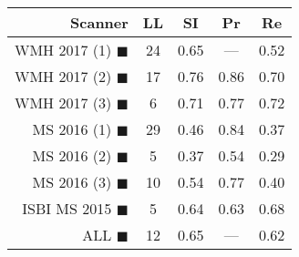 \begin{tabular}{rcccc}
\toprule
Scanner & LL & SI & Pr & Re \\
\midrule
WMH 2017 (1) {\color[rgb]{ 1.00 0.00 0.00}$\blacksquare$} & 24 & 0.65 & --- & 0.52 \\
WMH 2017 (2) {\color[rgb]{ 1.00 0.50 0.00}$\blacksquare$} & 17 & 0.76 & 0.86 & 0.70 \\
WMH 2017 (3) {\color[rgb]{ 1.00 0.80 0.00}$\blacksquare$} & 6 & 0.71 & 0.77 & 0.72 \\
MS  2016 (1) {\color[rgb]{ 0.20 0.80 0.00}$\blacksquare$} & 29 & 0.46 & 0.84 & 0.37 \\
MS  2016 (2) {\color[rgb]{ 0.00 0.40 1.00}$\blacksquare$} & 5 & 0.37 & 0.54 & 0.29 \\
MS  2016 (3) {\color[rgb]{ 0.60 0.00 1.00}$\blacksquare$} & 10 & 0.54 & 0.77 & 0.40 \\
ISBI MS 2015 {\color[rgb]{ 1.00 0.00 1.00}$\blacksquare$} & 5 & 0.64 & 0.63 & 0.68 \\
\midrule
ALL {\color[rgb]{ 1.00 1.00 1.00}$\blacksquare$} & 12 & 0.65 & --- & 0.62 \\
\bottomrule
\end{tabular}